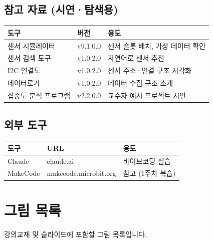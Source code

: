 \documentclass[11pt, a4paper]{article}
\begin{document}
\subsection{참고 자료 (시연·탐색용)}

\begin{table}[H]\centering
\begin{tabular}{lll}\toprule
\textbf{도구} & \textbf{버전} & \textbf{용도} \\\midrule
센서 시뮬레이터 & v9.1.0.0 & 센서 슬롯 배치, 가상 데이터 확인 \\
센서 검색 도구 & v1.0.2.0 & 자연어로 센서 추천 \\
I2C 연결도 & v1.0.2.0 & 센서 주소·연결 구조 시각화 \\
데이터로거 & v1.0.2.0 & 데이터 수집 구조 소개 \\
집중도 분석 프로그램 & v2.2.0.0 & 교수자 예시 프로젝트 시연 \\
\bottomrule
\end{tabular}
\end{table}

\subsection{외부 도구}

\begin{table}[H]\centering
\begin{tabular}{lll}\toprule
\textbf{도구} & \textbf{URL} & \textbf{용도} \\\midrule
Claude & claude.ai & 바이브코딩 실습 \\
MakeCode & makecode.microbit.org & 참고 (1주차 복습) \\
\bottomrule
\end{tabular}
\end{table}

\section{그림 목록}

강의교재 및 슬라이드에 포함할 그림 목록입니다.
\end{document}
